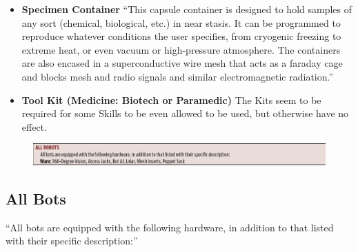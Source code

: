 \begin{itemize}
    \item \textbf{Specimen Container} “This capsule container is designed to hold samples of any sort (chemical, biological, etc.) in near stasis. It can be programmed to reproduce whatever conditions the user specifies, from cryogenic freezing to extreme heat, or even vacuum or high-pressure atmosphere. The containers are also encased in a superconductive wire mesh that acts as a faraday cage and blocks mesh and radio signals and similar electromagnetic radiation.” \citep[pg. 340]{ep2e_1.1_2019}
    
    \item \textbf{Tool Kit (Medicine: Biotech or Paramedic)} The Kits seem to be required for some Skills to be even allowed to be used, but otherwise have no effect.
\end{itemize}

\begin{figure}[h]
    \includegraphics[width=\textwidth]{img/allBot.png}
\end{figure}

\subsection{All Bots}

“All bots are equipped with the following hardware, in addition to that listed with their specific description:”

